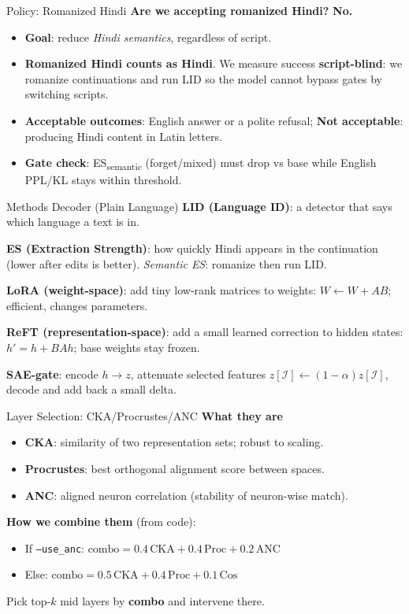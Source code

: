 \documentclass[aspectratio=169]{beamer}
\begin{document}
\begin{frame}{Policy: Romanized Hindi}
\small
\textbf{Are we accepting romanized Hindi?} \textbf{No.}
\begin{itemize}
  \item \textbf{Goal}: reduce \emph{Hindi semantics}, regardless of script.
  \item \textbf{Romanized Hindi counts as Hindi}. We measure success \textbf{script-blind}: we romanize continuations and run LID so the model cannot bypass gates by switching scripts.
  \item \textbf{Acceptable outcomes}: English answer or a polite refusal; \textbf{Not acceptable}: producing Hindi content in Latin letters.
  \item \textbf{Gate check}: ES\textsubscript{semantic} (forget/mixed) must drop vs base while English PPL/KL stays within threshold.
\end{itemize}
\end{frame}

\begin{frame}{Methods Decoder (Plain Language)}
\small
\textbf{LID (Language ID)}: a detector that says which language a text is in.

\textbf{ES (Extraction Strength)}: how quickly Hindi appears in the continuation (lower after edits is better). \emph{Semantic ES}: romanize then run LID.

\textbf{LoRA (weight-space)}: add tiny low-rank matrices to weights: $W\leftarrow W+AB$; efficient, changes parameters.

\textbf{ReFT (representation-space)}: add a small learned correction to hidden states: $h' = h + BAh$; base weights stay frozen.

\textbf{SAE-gate}: encode $h\to z$, attenuate selected features $z[\mathcal I]\leftarrow (1-\alpha)z[\mathcal I]$, decode and add back a small delta.
\end{frame}

\begin{frame}{Layer Selection: CKA/Procrustes/ANC}
\small
\textbf{What they are}
\begin{itemize}
  \item \textbf{CKA}: similarity of two representation sets; robust to scaling.
  \item \textbf{Procrustes}: best orthogonal alignment score between spaces.
  \item \textbf{ANC}: aligned neuron correlation (stability of neuron-wise match).
\end{itemize}
\vspace{2mm}
\textbf{How we combine them} (from code):
\begin{itemize}
  \item If \texttt{--use\_anc}: $\text{combo} = 0.4\,\text{CKA} + 0.4\,\text{Proc} + 0.2\,\text{ANC}$
  \item Else: $\text{combo} = 0.5\,\text{CKA} + 0.4\,\text{Proc} + 0.1\,\text{Cos}$
\end{itemize}
Pick top-$k$ mid layers by \textbf{combo} and intervene there.
\end{frame}
\end{document}
